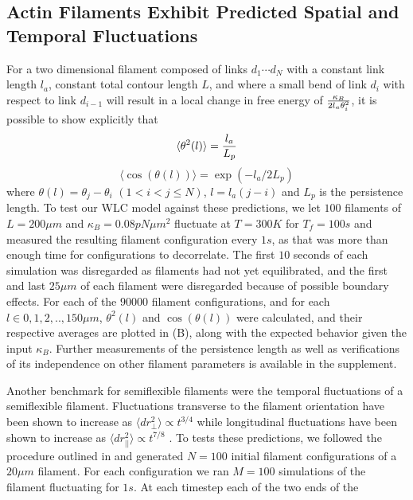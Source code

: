 \documentclass[12pt]{article}
\begin{document}
\subsection{Actin Filaments Exhibit Predicted Spatial and Temporal Fluctuations}
For a two dimensional filament composed of links $d_1\cdots d_N$ with a constant link length $l_a$, constant total contour
length $L$, and where a small bend of link
$d_i$ with respect to link $d_{i-1}$ will result in a local change in free energy of ${\kappa_B\over2l_a\theta_i^2}$, it
is possible to show explicitly that \cite{frontali1979}
\begin{equation}
  \langle\theta^2(l)\rangle = {l_a\over L_p}
  \label{eqn:thsq}
\end{equation}
\begin{equation} 
  \langle\cos(\theta(l))\rangle = \exp{(-l_a/2L_p)}
  \label{eqn:costh}
\end{equation} 
where $\theta(l) = \theta_j - \theta_i$ $(1<i<j\le N)$, $l = l_a(j-i)$ and $L_p$ is the persistence length. 
To test our WLC model against these predictions, we let $100$ filaments of $L=200\mu m$ and $\kappa_B=0.08 pN\mu m^2$ fluctuate at
$T=300K$ for $T_f = 100s$ and measured the resulting filament configuration every $1s$, as that was more than enough
time for configurations to decorrelate. The first $10$ seconds of each simulation was disregarded as filaments had not
yet equilibrated, and the first and last $25\mu m$ of each filament were disregarded because of possible boundary
effects. 
For each of the $90000$ filament configurations, and for each $l\in{0,1,2,..,150}\mu m$,
$\theta^2(l)$ and $\cos(\theta(l))$ were calculated, and their respective averages are plotted in 
(B), along with the expected behavior given the input $\kappa_B$.  
Further measurements of the persistence length as well as verifications of its independence on
other filament parameters is available in the supplement.
\par
Another benchmark for semiflexible filaments were the temporal fluctuations of a semiflexible filament.
Fluctuations transverse to the filament orientation have been 
shown to increase as $\langle dr_{\perp}^2\rangle\propto t^{3/4}$ while 
longitudinal fluctuations have been shown to increase as
$\langle dr_{||}^2\rangle\propto t^{7/8}$ \cite{everaers1999}. To tests these predictions, we followed the procedure outlined in
\cite{everaers1999} and generated $N = 100$ initial filament configurations of a $20\mu m$ filament. For each configuration
we ran $M = 100$ simulations of the filament fluctuating for $1s$. At each timestep each of the two ends of the
\end{document}

